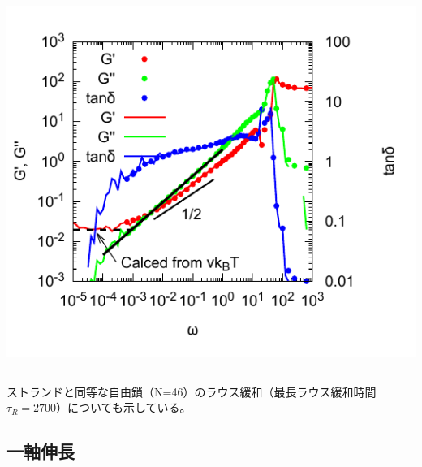 \documentclass[11pt, dvipdfmx]{beamer}
\begin{document}
\begin{frame}
\begin{columns}[totalwidth=1\textwidth]
\centering
\includegraphics[width=\columnwidth]{./fig/N_44_Freq_Sweep.pdf}

\end{columns}

ストランドと同等な自由鎖（N=46）のラウス緩和（最長ラウス緩和時間 $\tau_R = 2700$）についても示している。

\end{frame}


\subsection{一軸伸長}
\end{document}
